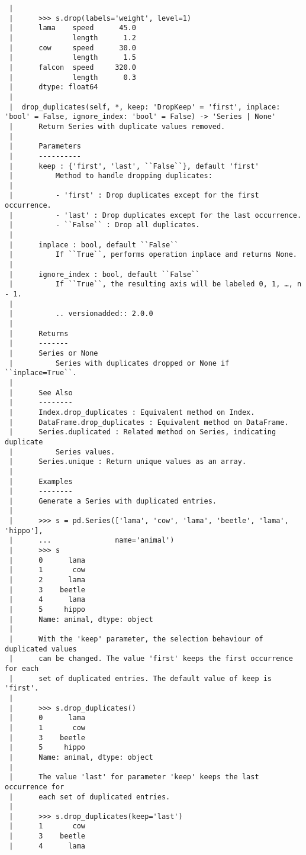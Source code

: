 \documentclass[
  letterpaper,
  DIV=11,
  numbers=noendperiod]{scrreprt}
\begin{document}
\begin{verbatim}
 |      
 |      >>> s.drop(labels='weight', level=1)
 |      lama    speed      45.0
 |              length      1.2
 |      cow     speed      30.0
 |              length      1.5
 |      falcon  speed     320.0
 |              length      0.3
 |      dtype: float64
 |  
 |  drop_duplicates(self, *, keep: 'DropKeep' = 'first', inplace: 'bool' = False, ignore_index: 'bool' = False) -> 'Series | None'
 |      Return Series with duplicate values removed.
 |      
 |      Parameters
 |      ----------
 |      keep : {'first', 'last', ``False``}, default 'first'
 |          Method to handle dropping duplicates:
 |      
 |          - 'first' : Drop duplicates except for the first occurrence.
 |          - 'last' : Drop duplicates except for the last occurrence.
 |          - ``False`` : Drop all duplicates.
 |      
 |      inplace : bool, default ``False``
 |          If ``True``, performs operation inplace and returns None.
 |      
 |      ignore_index : bool, default ``False``
 |          If ``True``, the resulting axis will be labeled 0, 1, …, n - 1.
 |      
 |          .. versionadded:: 2.0.0
 |      
 |      Returns
 |      -------
 |      Series or None
 |          Series with duplicates dropped or None if ``inplace=True``.
 |      
 |      See Also
 |      --------
 |      Index.drop_duplicates : Equivalent method on Index.
 |      DataFrame.drop_duplicates : Equivalent method on DataFrame.
 |      Series.duplicated : Related method on Series, indicating duplicate
 |          Series values.
 |      Series.unique : Return unique values as an array.
 |      
 |      Examples
 |      --------
 |      Generate a Series with duplicated entries.
 |      
 |      >>> s = pd.Series(['lama', 'cow', 'lama', 'beetle', 'lama', 'hippo'],
 |      ...               name='animal')
 |      >>> s
 |      0      lama
 |      1       cow
 |      2      lama
 |      3    beetle
 |      4      lama
 |      5     hippo
 |      Name: animal, dtype: object
 |      
 |      With the 'keep' parameter, the selection behaviour of duplicated values
 |      can be changed. The value 'first' keeps the first occurrence for each
 |      set of duplicated entries. The default value of keep is 'first'.
 |      
 |      >>> s.drop_duplicates()
 |      0      lama
 |      1       cow
 |      3    beetle
 |      5     hippo
 |      Name: animal, dtype: object
 |      
 |      The value 'last' for parameter 'keep' keeps the last occurrence for
 |      each set of duplicated entries.
 |      
 |      >>> s.drop_duplicates(keep='last')
 |      1       cow
 |      3    beetle
 |      4      lama

\end{verbatim}
\end{document}
